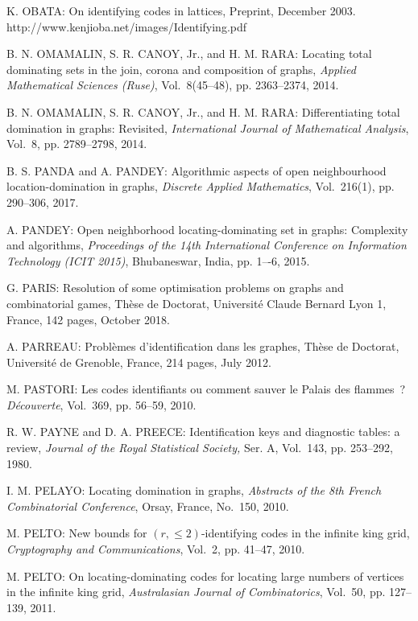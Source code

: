 \begin{thebibliography}{999}
K. OBATA: On identifying codes in lattices, Preprint, December 2003.\\ http://www.kenjioba.net/images/Identifying.pdf

B. N. OMAMALIN, S. R. CANOY, Jr., and H. M. RARA: Locating total dominating sets in the join, corona and composition of graphs, {\it Applied Mathematical Sciences (Ruse)}, Vol.~8(45--48), pp. 2363--2374, 2014.

B. N. OMAMALIN, S. R. CANOY, Jr., and H. M. RARA: Differentiating total domination in graphs: Revisited, {\it International Journal of Mathematical Analysis}, Vol.~8, pp. 2789--2798, 2014. 

B. S. PANDA and A. PANDEY: Algorithmic aspects of open neighbourhood location-domination in graphs, {\it Discrete Applied Mathematics}, Vol.~216(1), pp. 290--306, 2017.

A. PANDEY: Open neighborhood locating-dominating set in graphs: Complexity and algorithms, {\it Proceedings of the 14th International Conference on Information Technology (ICIT 2015)}, Bhubaneswar, India, pp. 1–-6, 2015.

G. PARIS: Resolution of some optimisation problems on graphs and combinatorial games, Th\`ese de Doctorat, Universit\'e Claude Bernard Lyon 1, France, 142 pages, October 2018.

A. PARREAU: Probl\`emes d'identification dans les graphes, Th\`ese de Doctorat, Universit\'e de Grenoble, France, 214 pages, July 2012.

M. PASTORI: Les codes identifiants ou comment sauver le Palais des flammes~? {\it D\'ecouverte}, Vol.~369, pp. 56--59, 2010.

R. W. PAYNE and D. A. PREECE: Identification keys and diagnostic tables: a review, {\it Journal of the Royal Statistical Society,} Ser. A, Vol.~143, pp. 253--292, 1980.

I. M. PELAYO: Locating domination in graphs, {\it Abstracts of the 8th French Combinatorial Conference}, Orsay, France, No.~150, 2010.

M. PELTO: New bounds for $(r,\leq 2)$-identifying codes in the infinite king grid, {\it Cryptography and Communications}, Vol.~2, pp. 41--47, 2010.

M. PELTO: On locating-dominating codes for locating large numbers of vertices in the infinite king grid, {\it Australasian Journal of Combinatorics}, Vol.~50, pp. 127--139, 2011.


\end{thebibliography}
